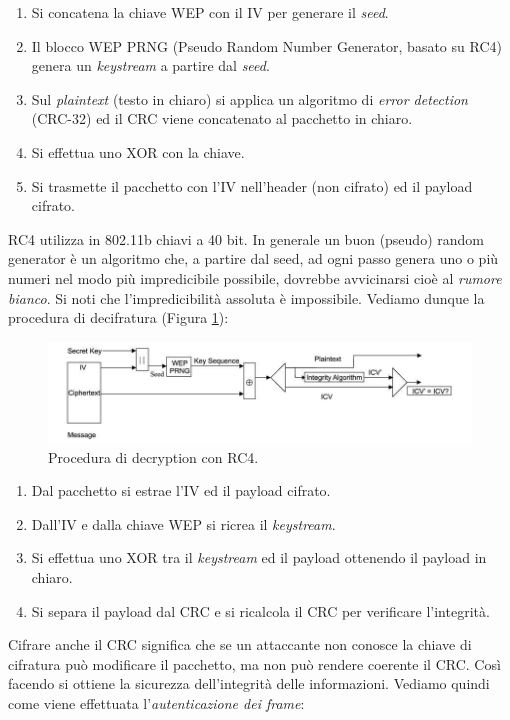 \begin{enumerate}
	\item Si concatena la chiave WEP con il IV per generare il \textit{seed}.
	\item Il blocco WEP PRNG (Pseudo Random Number Generator, basato su RC4) genera un \textit{keystream} a partire dal \textit{seed}.
	\item Sul \textit{plaintext} (testo in chiaro) si applica un algoritmo di \textit{error detection} (CRC-32) ed il CRC viene concatenato al pacchetto in chiaro.
	\item Si effettua uno XOR con la chiave.
	\item Si trasmette il pacchetto con l'IV nell'header (non cifrato) ed il payload cifrato.
\end{enumerate}
RC4 utilizza in 802.11b chiavi a 40 bit. In generale un buon (pseudo) random generator è un algoritmo che, a partire dal seed, ad ogni passo genera uno o più numeri nel modo più impredicibile possibile, dovrebbe avvicinarsi cioè al \textit{rumore bianco}. Si noti che l'impredicibilità assoluta è impossibile. Vediamo dunque la procedura di decifratura (Figura \ref{img:RC4-decryption}):
\begin{figure}[htbp]
	\centering
	\includegraphics[scale = 0.5]{images/RC4-decryption}
	\caption{Procedura di decryption con RC4.}
	\label{img:RC4-decryption}
\end{figure}
\begin{enumerate}
	\item Dal pacchetto si estrae l'IV ed il payload cifrato.
	\item Dall'IV e dalla chiave WEP si ricrea il \textit{keystream}.
	\item Si effettua uno XOR tra il \textit{keystream} ed il payload ottenendo il payload in chiaro.
	\item Si separa il payload dal CRC e si ricalcola il CRC per verificare l'integrità.
\end{enumerate}
Cifrare anche il CRC significa che se un attaccante non conosce la chiave di cifratura può modificare il pacchetto, ma non può rendere coerente il CRC. Così facendo si ottiene la sicurezza dell'integrità delle informazioni. Vediamo quindi come viene effettuata l'\textit{autenticazione dei frame}:

